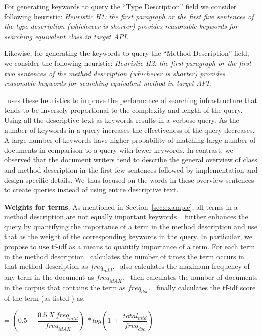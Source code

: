 For generating keywords to query the ``Type Description'' field we consider following heuristic:
\textit{Heuristic H1:  the first paragraph or the first five sentences of the type description (whichever is shorter) provides reasonable keywords for searching equivalent class in target API.} 

Likewise, for generating the keywords to query the ``Method Description'' field, we consider the following heuristic: \textit{Heuristic H2: the first paragraph or the first two sentences of the method description (whichever is shorter) provides reasonable keywords for searching equivalent method in target API.}

\tool\ uses these heuristics to improve the performance of searching infrastructure
that tends to be inversely proportional to the complexity and length of the query.
Using all the descriptive text as keywords results in a verbose query.
As the number of keywords in a query increases the effectiveness of the query decreases.
A large number of keywords have higher probability of matching large number of documents in comparison to a query with fewer keywords.
In contrast, we observed that the document writers tend to describe the general
overview of class and method description in the first few sentences followed by implementation and design specific details.
We thus focused on the words in these overview sentences to create queries instead of using entire descriptive text.


\textbf{Weights for terms}. As mentioned in Section~\ref{sec:example},
all terms in a method description are not equally important keywords. 
\tool\ further enhances the query by quantifying the importance of a term in the method description and use that as the weight of the corresponding keywords in the query.
In particular, we propose to use tf-idf\cite{manning2008introduction} as a means to quantify importance of a term.
For each term in the method description \tool\ calculates the number of times the term occurs in that method description as $freq_{mtd}$.
\tool\ also calculates the maximum frequency of any term in the document as $freq_{MAX}$.
\tool\ then calculates the number of documents in the corpus that contains the term as $freq_{doc}$.
\tool\ finally calculates the tf-idf score of the term (as listed \cite{manning2008introduction}) as:

\begin{center}
	 = $(0.5\ +\dfrac{0.5\ X\ freq_{mtd}}{freq_{MAX}})\ * log(1\ +\ \dfrac{total_{mtd}}{freq_{doc}})$
\end{center}

